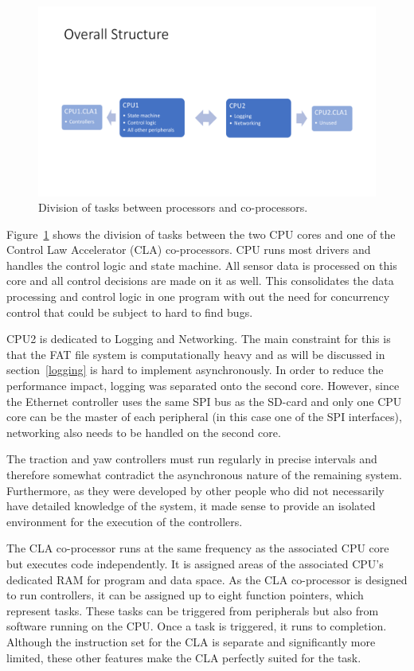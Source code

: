 \begin{figure}[H]
    \centering \includegraphics[width=1.0\textwidth]{./figures/system_structure.pdf}
    \caption{Division of tasks between processors and co-processors.}
    \label{fig:system_structure}
\end{figure}

Figure~\ref{fig:system_structure} shows the division of tasks between the two CPU cores and one of the Control Law Accelerator (CLA) co-processors. CPU runs most drivers and handles the control logic and state machine. All sensor data is processed on this core and all control decisions are made on it as well. This consolidates the data processing and control logic in one program with out the need for concurrency control that could be subject to hard to find bugs.

CPU2 is dedicated to Logging and Networking. The main constraint for this is that the FAT file system is computationally heavy and as will be discussed in section~\ref{logging} is hard to implement asynchronously. In order to reduce the performance impact, logging was separated onto the second core. However, since the Ethernet controller uses the same SPI bus as the SD-card and only one CPU core can be the master of each peripheral (in this case one of the SPI interfaces), networking also needs to be handled on the second core.

The traction and yaw controllers must run regularly in precise intervals and therefore somewhat contradict the asynchronous nature of the remaining system. Furthermore, as they were developed by other people who did not necessarily have detailed knowledge of the system, it made sense to provide an isolated environment for the execution of the controllers.

The CLA co-processor runs at the same frequency as the associated CPU core but executes code independently. It is assigned areas of the associated CPU's dedicated RAM for program and data space. As the CLA co-processor is designed to run controllers, it can be assigned up to eight function pointers, which represent tasks. These tasks can be triggered from peripherals but also from software running on the CPU. Once a task is triggered, it runs to completion. Although the instruction set for the CLA is separate and significantly more limited, these other features make the CLA perfectly suited for the task.

